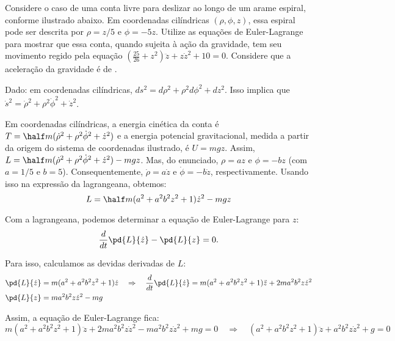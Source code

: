 \begin{question}
	Considere o caso de uma conta livre para deslizar ao longo de um arame espiral, conforme ilustrado abaixo.
	Em coordenadas cilíndricas $(\rho, \phi, z)$, essa espiral pode ser descrita por $\rho = z/5$ e $\phi = -5z$. %
	Utilize as equações de Euler-Lagrange para mostrar que essa conta, quando sujeita à ação da gravidade, tem seu movimento regido pela equação $(\frac{25}{26} + z^2)\ddot z + z\dot z^2 + 10 = 0$. %
	Considere que a aceleração da gravidade é de .


	\begin{compactdesc}
		\item[Dado:] em coordenadas cilíndricas, $ds^2 = d\rho^2 + \rho^2 d\phi^2 + dz^2$.
		Isso implica que $\dot s^2 = \dot\rho^2 + \rho^2 \dot\phi^2 + \dot z^2$.
	\end{compactdesc}

	\begin{solution}
		Em coordenadas cilíndricas, a energia cinética da conta é $T = \half m (\dot\rho^2 + \rho^2\dot\phi^2 + \dot z^2)$ e a energia potencial gravitacional, medida a partir da origem do sistema de coordenadas ilustrado, é $U = mgz$.
		Assim, $L = \half m (\dot\rho^2 + \rho^2\dot\phi^2 + \dot z^2) - mgz$.
		Mas, do enunciado, $\rho = az$ e $\phi = -bz$ (com $a = 1/5$ e $b = 5$). %
		Consequentemente, $\dot\rho = a\dot z$ e $\dot \phi = -b\dot z$, respectivamente.
		Usando isso na expressão da lagrangeana, obtemos:
		\begin{equation*}
			L = \half m (a^2 + a^2 b^2 z^2 + 1) \dot z^2 - mgz
		\end{equation*}

		Com a lagrangeana, podemos determinar a equação de Euler-Lagrange para $z$:
		\begin{equation*}
			\frac{d}{dt}\pd{L}{\dot z} - \pd{L}{z} = 0.
		\end{equation*}

		Para isso, calculamos as devidas derivadas de $L$:
		\begin{align*}
			\pd{L}{\dot z} &= m (a^2 + a^2 b^2 z^2 + 1) \dot z \quad\Rightarrow\quad
				\frac{d}{dt}\pd{L}{\dot z} = m (a^2 + a^2 b^2 z^2 + 1) \ddot z + 2ma^2b^2z\dot z^2 \\
			\pd{L}{z} &= ma^2b^2z\dot z^2 - mg
		\end{align*}

		Assim, a equação de Euler-Lagrange fica:
		\begin{equation*}
			m (a^2 + a^2 b^2 z^2 + 1) \ddot z + 2ma^2b^2z\dot z^2 - ma^2b^2z\dot z^2 + mg = 0
			\quad\Rightarrow\quad
			(a^2 + a^2 b^2 z^2 + 1) \ddot z + a^2b^2z\dot z^2 + g = 0
		\end{equation*}


\end{solution}
\end{question}
